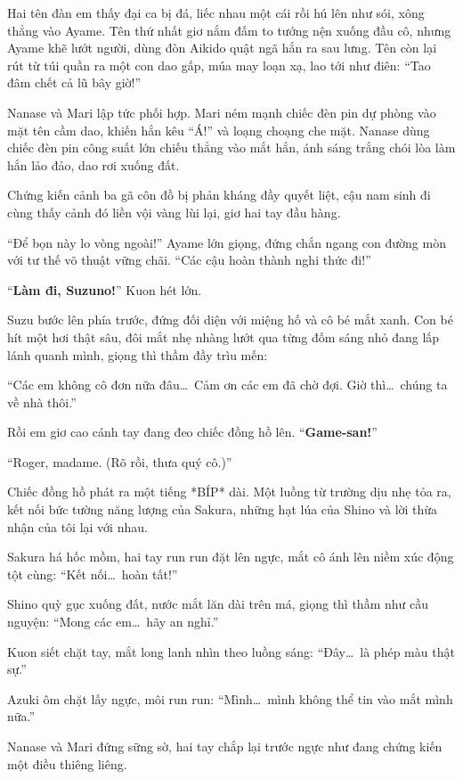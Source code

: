\documentclass[../main.tex]{subfiles}
\begin{document}
Hai tên đàn em thấy đại ca bị đá, liếc nhau một cái rồi hú lên như sói, xông thẳng vào Ayame. Tên thứ nhất giơ nắm đấm to tướng nện xuống đầu cô, nhưng Ayame khẽ lướt người, dùng đòn Aikido quật ngã hắn ra sau lưng. Tên còn lại rút từ túi quần ra một con dao gấp, múa may loạn xạ, lao tới như điên: ``Tao đâm chết cả lũ bây giờ!''

Nanase và Mari lập tức phối hợp. Mari ném mạnh chiếc đèn pin dự phòng vào mặt tên cầm dao, khiến hắn kêu ``Á!'' và loạng choạng che mặt. Nanase dùng chiếc đèn pin công suất lớn chiếu thẳng vào mắt hắn, ánh sáng trắng chói lòa làm hắn lảo đảo, dao rơi xuống đất.

Chứng kiến cảnh ba gã côn đồ bị phản kháng đầy quyết liệt, cậu nam sinh đi cùng thấy cảnh đó liền vội vàng lùi lại, giơ hai tay đầu hàng.

``Để bọn này lo vòng ngoài!'' Ayame lớn giọng, đứng chắn ngang con đường mòn với tư thế võ thuật vững chãi. ``Các cậu hoàn thành nghi thức đi!''

``\textbf{Làm đi, Suzuno!}'' Kuon hét lớn.

Suzu bước lên phía trước, đứng đối diện với miệng hố và cô bé mắt xanh. Con bé hít một hơi thật sâu, đôi mắt nhẹ nhàng lướt qua từng đốm sáng nhỏ đang lấp lánh quanh mình, giọng thì thầm đầy trìu mến:

``Các em không cô đơn nữa đâu\dots\ Cảm ơn các em đã chờ đợi. Giờ thì\dots\ chúng ta về nhà thôi.''

Rồi em giơ cao cánh tay đang đeo chiếc đồng hồ lên. ``\textbf{Game-san!}''

``Roger, madame. (Rõ rồi, thưa quý cô.)''

Chiếc đồng hồ phát ra một tiếng *BÍP* dài. Một luồng từ trường dịu nhẹ tỏa ra, kết nối bức tường năng lượng của Sakura, những hạt lúa của Shino và lời thừa nhận của tôi lại với nhau.

Sakura há hốc mồm, hai tay run run đặt lên ngực, mắt cô ánh lên niềm xúc động tột cùng: ``Kết nối\dots\ hoàn tất!''

Shino quỳ gục xuống đất, nước mắt lăn dài trên má, giọng thì thầm như cầu nguyện: ``Mong các em\dots\ hãy an nghỉ.''

Kuon siết chặt tay, mắt long lanh nhìn theo luồng sáng: ``Đây\dots\ là phép màu thật sự.''

Azuki ôm chặt lấy ngực, môi run run: ``Mình\dots\ mình không thể tin vào mắt mình nữa.''

Nanase và Mari đứng sững sờ, hai tay chắp lại trước ngực như đang chứng kiến một điều thiêng liêng.
\end{document}
